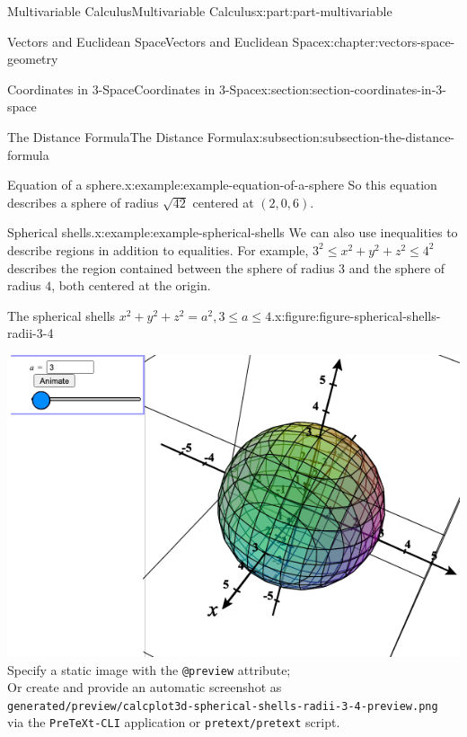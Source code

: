 \documentclass[twoside,10pt,]{tufte-book}
\newcommand{\mono}[1]{\texttt{#1}}
\numberwithin{equation}{part}
\newlength{\qrsize}
\newlength{\previewwidth}
\begin{document}
\begin{partptx}{Multivariable Calculus}{}{Multivariable Calculus}{}{}{x:part:part-multivariable}
\begin{chapterptx}{Vectors and Euclidean Space}{}{Vectors and Euclidean Space}{}{}{x:chapter:vectors-space-geometry}
\begin{sectionptx}{Coordinates in 3-Space}{}{Coordinates in 3-Space}{}{}{x:section:section-coordinates-in-3-space}
\begin{subsectionptx}{The Distance Formula}{}{The Distance Formula}{}{}{x:subsection:subsection-the-distance-formula}
\begin{example}{Equation of a sphere.}{x:example:example-equation-of-a-sphere}
So this equation describes a sphere of radius \(\sqrt{42}\) centered at \((2,0,6)\).%
\end{example}
\begin{example}{Spherical shells.}{x:example:example-spherical-shells}%
We can also use inequalities to describe regions in addition to equalities. For example, \(3^2\leq x^{2}+y^{2}+z^{2}\leq 4^2\) describes the region contained between the sphere of radius \(3\) and the sphere of radius \(4\), both centered at the origin.%
\end{example}
\begin{figureptx}{The spherical shells \(x^2 + y^2 + z^2 = a^2, 3\leq a\leq 4\).}{x:figure:figure-spherical-shells-radii-3-4}{}%
\centering
\setlength{\qrsize}{9em}
\setlength{\previewwidth}{\linewidth}
\addtolength{\previewwidth}{-\qrsize}
\begin{tcbraster}[raster columns=2, raster column skip=1pt, raster halign=center, raster force size=false, raster left skip=0pt, raster right skip=0pt]%
\begin{tcolorbox}[previewstyle, width=\previewwidth]%
%
{\includegraphics[width=0.80\linewidth,height=\qrsize,keepaspectratio]{generated/preview/calcplot3d-spherical-shells-radii-3-4-preview.png}}%
{\small{}Specify a static image with the \mono{@preview} attribute;\\%
Or create and provide an automatic screenshot as\\%
\mono{generated/preview/calcplot3d-spherical-shells-radii-3-4-preview.png}\\%
via the \mono{PreTeXt-CLI} application or \mono{pretext/pretext} script.}%
\end{tcolorbox}%
\begin{tcolorbox}[qrstyle]%
{\hypersetup{urlcolor=black}}%

\end{tcolorbox}
\end{tcbraster}
\end{figureptx}
\end{subsectionptx}
\end{sectionptx}
\end{chapterptx}
\end{partptx}
\end{document}
